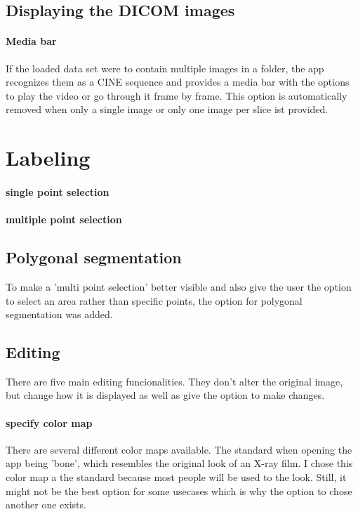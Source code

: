 \subsection{Displaying the DICOM images}
\label{Displaying the DICOM images}
\paragraph{Media bar}
If the loaded data set were to contain multiple images in a folder, the app recognizes them as a CINE sequence and provides a media bar with the options to play the video or go through it frame by frame.
This option is automatically removed when only a single image or only one image per slice ist provided.

\section{Labeling}
\label{Labeling}
\paragraph{single point selection}
\paragraph{multiple point selection}

\subsection{Polygonal segmentation}
\label{Polygonal segmentation}
To make a 'multi point selection' better visible and also give the user the option to select an area rather than specific points, the option for polygonal segmentation was added.

\subsection{Editing}
\label{Editing}
There are five main editing funcionalities. They don't alter the original image, but change how it is displayed as well as give the option to make changes.
\paragraph{specify color map}
There are several different color maps available. The standard when opening the app being 'bone', which resembles the original look of an X-ray film. I chose this color map a the standard because most people will be used to the look. Still, it might not be the best option for some usecases which is why the option to chose another one exists.
